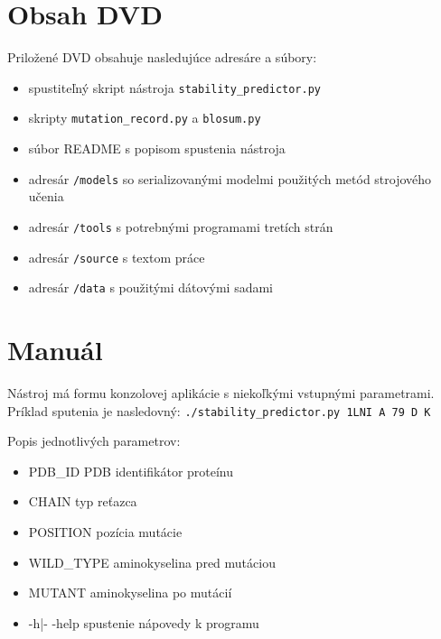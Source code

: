 
\chapter{Obsah DVD}

Priložené DVD obsahuje nasledujúce adresáre a súbory:

\begin{itemize}
	
	\item spustiteľný skript nástroja {\tt stability\_predictor.py}
	\item skripty {\tt mutation\_record.py} a {\tt blosum.py}
	\item súbor README s popisom spustenia nástroja
	\item adresár {\tt /models} so serializovanými modelmi použitých metód strojového učenia
	\item adresár {\tt /tools} s potrebnými programami tretích strán
	\item adresár {\tt /source} s textom práce
	\item adresár {\tt /data} s použitými dátovými sadami
	
	
	
\end{itemize}

\chapter{Manuál}

Nástroj má formu konzolovej aplikácie s niekoľkými vstupnými parametrami. Príklad sputenia je nasledovný:
{\tt ./stability\_predictor.py 1LNI A 79 D K}

Popis jednotlivých parametrov:
\begin{itemize}
	\item PDB\_ID PDB identifikátor proteínu
	\item CHAIN typ reťazca
	\item POSITION pozícia mutácie
	\item WILD\_TYPE aminokyselina pred mutáciou
	\item MUTANT aminokyselina po mutácií
	\item -h|- -help spustenie nápovedy k programu
\end{itemize}


